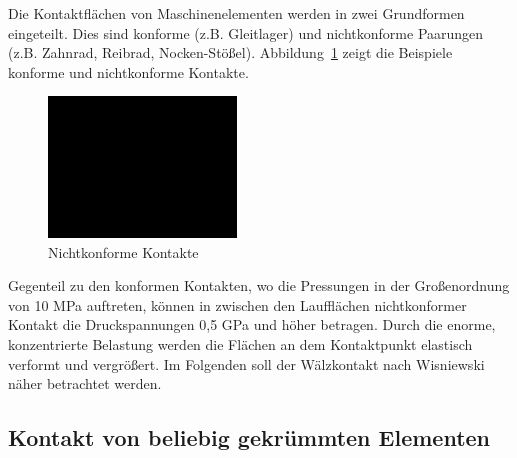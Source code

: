 Die Kontaktflächen von Maschinenelementen werden in zwei Grundformen eingeteilt.
Dies sind konforme (z.B. Gleitlager) und nichtkonforme Paarungen (z.B. Zahnrad, Reibrad, Nocken-Stößel).
Abbildung~\ref{fig:nichtkonforme_kontakte} zeigt die Beispiele konforme und nichtkonforme Kontakte.
\begin{figure}[htb]
    \centering
    \includegraphics[width=5cm]{./images/blank_img.jpg}
    \caption{Nichtkonforme Kontakte}
    \label{fig:nichtkonforme_kontakte}
\end{figure}
%
Gegenteil zu den konformen Kontakten, wo die Pressungen in der Großenordnung von 10 MPa auftreten, können in zwischen den Laufflächen nichtkonformer Kontakt die Druckspannungen 0,5 GPa und höher betragen.
Durch die enorme, konzentrierte Belastung werden die Flächen an dem Kontaktpunkt elastisch verformt und vergrößert.
Im Folgenden soll der Wälzkontakt nach Wisniewski\cite{wisniewski} näher betrachtet werden.

\subsection{Kontakt von beliebig gekrümmten Elementen}
\label{sub:kontakt_von_beliebig_gekruemmten_elementen}

